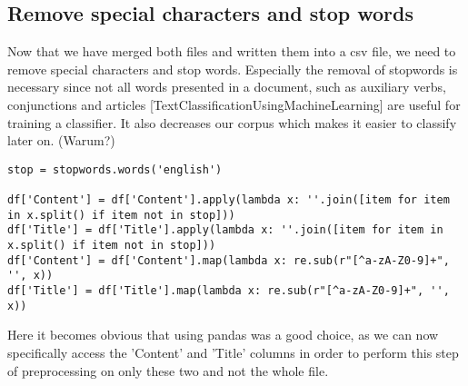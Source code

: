 \documentclass[a4paper, 11pt,titlepage,oneside,openany]{book}
\begin{document}
\subsection{Remove special characters and stop words}
Now that we have merged both files and written them into a csv file, we need to remove special characters and stop words. Especially the removal of stopwords is necessary since not all words presented in a document, such as auxiliary verbs, conjunctions and articles [TextClassificationUsingMachineLearning] are useful for training a classifier. It also decreases our corpus which makes it easier to classify later on. (Warum?)\\
\noindent
\begin{minipage}{\linewidth}
\begin{lstlisting}[frame=single]
stop = stopwords.words('english')

df['Content'] = df['Content'].apply(lambda x: ''.join([item for item in x.split() if item not in stop]))
df['Title'] = df['Title'].apply(lambda x: ''.join([item for item in x.split() if item not in stop]))
df['Content'] = df['Content'].map(lambda x: re.sub(r"[^a-zA-Z0-9]+", '', x))
df['Title'] = df['Title'].map(lambda x: re.sub(r"[^a-zA-Z0-9]+", '', x))
\end{lstlisting}
\end{minipage}
\noindent Here it becomes obvious that using pandas was a good choice, as we can now specifically access the 'Content' and 'Title' columns in order to perform this step of preprocessing on only these two and not the whole file.
\end{document}
